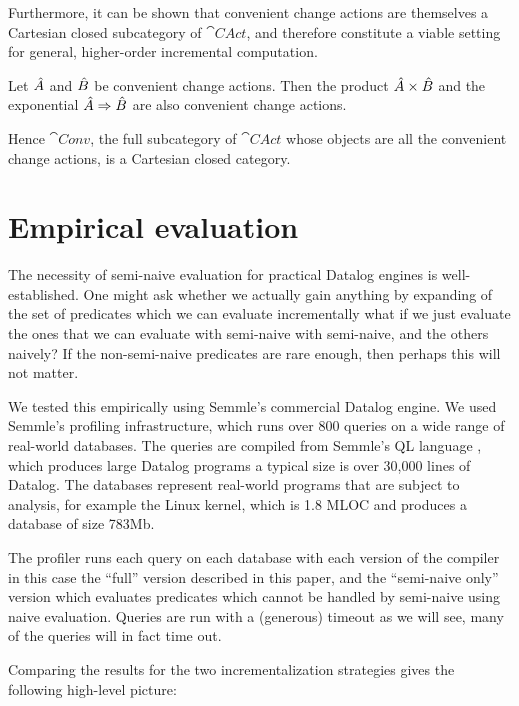 Furthermore, it can be shown that convenient change actions are themselves a Cartesian closed
subcategory of $\cat{CAct}$, and therefore constitute a viable setting for general, higher-order
incremental computation.

\begin{prop}
  Let $\hat{A}$ and $\hat{B}$ be convenient change actions. Then the product 
  $\hat{A} \times \hat{B}$ and the exponential $\hat{A} \Rightarrow \hat{B}$ are also convenient
  change actions.
  
  Hence $\cat{Conv}$, the full subcategory of $\cat{CAct}$ whose objects are all the convenient change
  actions, is a Cartesian closed category.
\end{prop}

\section{Empirical evaluation}
\label{sec:empirical}

The necessity of semi-naive evaluation for practical Datalog engines is
well-established. One might ask whether we actually gain anything by expanding of the set of predicates
which we can evaluate incrementally \textemdash{} what if we just evaluate the
ones that we can evaluate with semi-naive with semi-naive, and the others
naively? If the non-semi-naive predicates are rare enough, then perhaps this
will not matter.

We tested this empirically using Semmle's commercial Datalog engine. We used
Semmle's profiling infrastructure, which runs over 800 queries on a wide range
of real-world databases. The queries are compiled from Semmle's QL language
\autocite{avgustinov2016ql}, which produces large Datalog programs \textemdash{}
a typical size is over 30,000 lines of Datalog. The databases represent
real-world programs that are subject to analysis, for example the Linux kernel,
which is 1.8 MLOC and produces a database of size 783Mb.

The profiler runs each query on each database with each version of the compiler
\textemdash{} in this case the ``full'' version described in this paper, and the
``semi-naive only'' version which evaluates predicates which cannot be handled
by semi-naive using naive evaluation. Queries are run with a (generous) timeout
\textemdash{} as we will see, many of the queries will in fact time out.

Comparing the results for the two incrementalization strategies gives
the following high-level picture:

